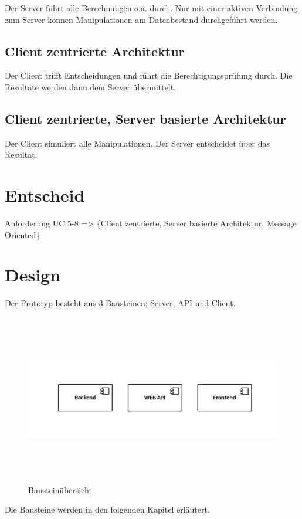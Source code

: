 \documentclass[oneside,11pt,parskip=half,ngerman]{scrreprt}
\makeatletter
\def\maxwidth{\ifdim\Gin@nat@width>\linewidth\linewidth
\else\Gin@nat@width\fi}
\let\Oldincludegraphics\includegraphics
\renewcommand{\includegraphics}[1]{\Oldincludegraphics[width=\maxwidth,height=20em,keepaspectratio]{#1}}
\makeatother
\begin{document}
Der Server führt alle Berechnungen o.ä. durch. Nur mit einer aktiven
Verbindung zum Server können Manipulationen am Datenbestand durchgeführt
werden.

\subsection{Client zentrierte
Architektur}\label{client-zentrierte-architektur}

Der Client trifft Entscheidungen und führt die Berechtigungsprüfung
durch. Die Resultate werden dann dem Server übermittelt.

\subsection{Client zentrierte, Server basierte
Architektur}\label{client-zentrierte-server-basierte-architektur}

Der Client simuliert alle Manipulationen. Der Server entscheidet über
das Resultat.

\section{Entscheid}\label{entscheid}

Anforderung UC 5-8 =\textgreater{} \{Client zentrierte, Server basierte
Architektur, Message Oriented\}

\section{Design}\label{design}

Der Prototyp besteht aus 3 Bausteinen; Server, API und Client.

\begin{figure}[htbp]
\centering
\includegraphics{img/design_components.jpg}
\caption{Bausteinübersicht\label{fig:bausteinübersicht}}
\end{figure}

Die Bausteine werden in den folgenden Kapitel erläutert.
\end{document}
